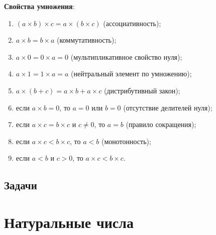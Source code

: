 \textbf{Свойства умножения}:
\begin{enumerate}[Prod1]
\item $(a\times b)\times c = a\times (b\times c)$ (ассоциативность);
\item $a\times b=b\times a$ (коммутативность);
\item $a\times 0=0\times a=0$ (мультипликативное свойство нуля);
\item $a\times 1=1\times a=a$ (нейтральный элемент по умножению);
\item $a\times(b+c)=a\times b+a\times c$ (дистрибутивный закон);
\item если $a\times b=0$, то $a=0$ или $b=0$ (отсутствие делителей нуля);
\item если $a\times c=b\times c$ и $c\ne 0$, то $a=b$ (правило сокращения);
\item если $a\times c<b\times c$, то $a<b$ (монотонность);
\item если $a<b$ и $c>0$, то $a\times c<b\times c$.
\end{enumerate}


\subsection{Задачи}


\section{Натуральные числа}

